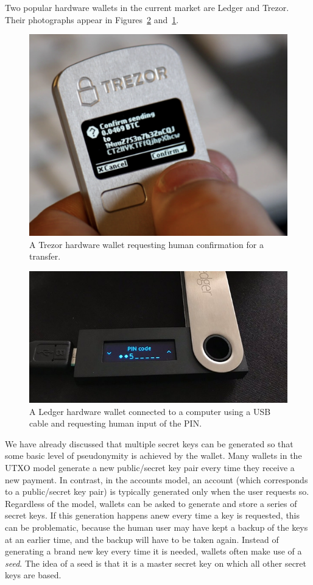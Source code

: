 Two popular hardware wallets in the current market are Ledger and Trezor.
Their photographs appear in Figures~\ref{fig.ledger} and~\ref{fig.trezor}.

\begin{figure}[h]
  \centering
  \includegraphics[width=0.7 \columnwidth,keepaspectratio]{figures/trezor-tx.png}
  \caption{A Trezor hardware wallet requesting human confirmation for a transfer.}
  \label{fig.trezor}
\end{figure}

\begin{figure}[h]
  \centering
  \includegraphics[width=0.7 \columnwidth,keepaspectratio]{figures/ledger-pin.png}
  \caption{A Ledger hardware wallet connected to a computer using a USB cable and
           requesting human input of the PIN.}
  \label{fig.ledger}
\end{figure}

We have already discussed that multiple secret keys can be generated so that
some basic level of pseudonymity is achieved by the wallet. Many wallets in the
UTXO model generate a new public/secret key pair every time they receive a new
payment. In contrast, in the accounts model, an account (which corresponds to
a public/secret key pair) is typically generated only when the user requests
so. Regardless of the model, wallets can be asked to generate and store
a series of secret keys. If this generation happens anew every time a key
is requested, this can be problematic, because the human user may have
kept a backup of the keys at an earlier time, and the backup will have to
be taken again. Instead of generating a brand new key every time it is
needed, wallets often make use of a \emph{seed}. The idea
of a seed is that it is a master secret key on which all other secret
keys are based.


